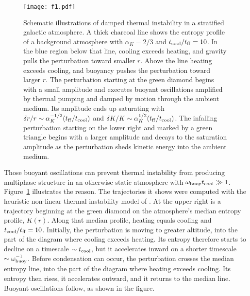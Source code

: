 \documentclass[twocolumn]{aastex63}
\begin{document}
\begin{figure}[b]
\texttt{[image: f1.pdf]}
\caption{Schematic illustrations of damped thermal instability in a stratified galactic atmosphere.  A thick charcoal line shows the entropy profile of a background atmosphere with $\alpha_K = 2/3$ and $t_{\rm cool} / t_{\rm ff} = 10$. In the blue region below that line, cooling exceeds heating, and gravity pulls the perturbation toward smaller $r$.  Above the line heating exceeds cooling, and buoyancy pushes the perturbation toward larger $r$.  The perturbation starting at the green diamond begins with a small amplitude and executes buoyant oscillations amplified by thermal pumping and damped by motion through the ambient medium.  Its amplitude ends up saturating with $\delta r / r \sim \alpha_K^{-1/2} (t_{\rm ff}/t_{\rm cool})$ and $\delta K / K \sim \alpha_K^{1/2} (t_{\rm ff} / t_{\rm cool})$.  The infalling perturbation starting on the lower right and marked by a green triangle begins with a larger amplitude and decays to the saturation amplitude as the perturbation sheds kinetic energy into the ambient medium.
\label{fig:damping}}
\end{figure}

Those buoyant oscillations can prevent thermal instability from producing multiphase structure in an otherwise static atmosphere with $\omega_{\rm buoy} t_{\rm cool} \gg 1$.  Figure~\ref{fig:damping} illustrates the reason.  The trajectories it shows were computed with the heuristic non-linear thermal instability model of \citet{Voit_2018ApJ...868..102V}.  At the upper right is a trajectory beginning at the green diamond on the atmosphere's median entropy profile, $\bar{K}(r)$. Along that median profile, heating equals cooling and $t_{\rm cool} / t_{\rm ff} = 10$. Initially, the perturbation is moving to greater altitude, into the part of the diagram where cooling exceeds heating.  Its entropy therefore starts to decline on a timescale $\sim t_{\rm cool}$, but it accelerates inward on a shorter timescale $\sim \omega_{\rm buoy}^{-1}$.  Before condensation can occur, the perturbation crosses the median entropy line, into the part of the diagram where heating exceeds cooling.  Its entropy then rises, it accelerates outward, and it returns to the median line.  Buoyant oscillations follow, as shown in the figure.  
\end{document}
